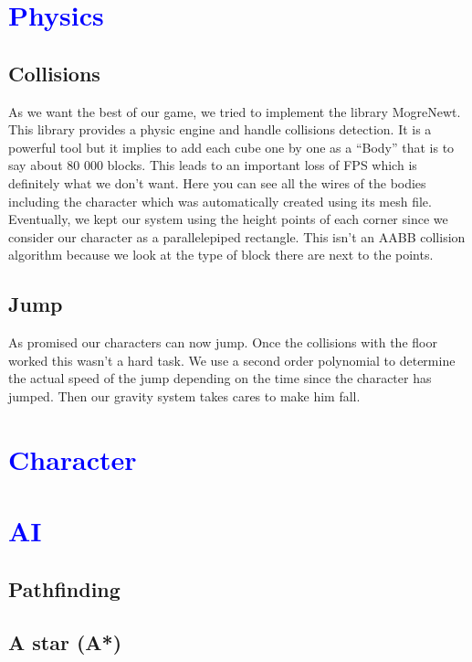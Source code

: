 \documentclass[article]{report}             %
\begin{document}
		\chapter{\textcolor{blue}{Physics}}
			\section{Collisions}
				As we want the best of our game, we tried to implement the library MogreNewt. This library provides a physic engine and handle collisions detection. It is a powerful tool but it implies to add each cube one by one as a \enquote{Body} that is to say about 80 000 blocks. This leads to an important loss of FPS which is definitely what we don't want. Here you can see all the wires of the bodies including the character which was automatically created using its mesh file.\\

Eventually, we kept our system using the height points of each corner since we consider our character as a parallelepiped rectangle. This isn't an AABB collision algorithm because we look at the type of block there are next to the points.

			\section{Jump}
				As promised our characters can now jump. Once the collisions with the floor worked this wasn't a hard task. We use a second order polynomial to determine the actual speed of the jump depending on the time since the character has jumped. Then our gravity system takes cares to make him fall.
				
		\chapter{\textcolor{blue}{Character}}

		\chapter{\textcolor{blue}{AI}}
			\section{Pathfinding}
				
			\section{A star (A*)}
		
\end{document}
